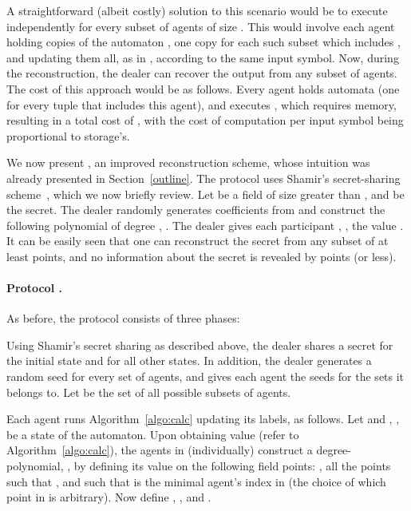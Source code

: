 \documentclass[letterpaper,11pt]{article}
\begin{document}
A straightforward (albeit costly) solution to this scenario would be to execute  independently for every subset of agents of size .  This would involve each agent  holding  copies of the automaton , one copy for each such subset which includes , and updating them all, as in , according to the same input symbol.  
Now, during the reconstruction, the dealer can recover the
output from any subset of  agents. The cost of this approach would be as follows.  Every agent holds  automata (one for every  tuple that includes this agent), and executes , which requires  memory, resulting in a total cost of ,
with the cost of computation per input symbol being proportional to storage's.
 

We now present , an improved  reconstruction scheme,
whose intuition was already presented in Section~\ref{outline}. The protocol
uses Shamir's secret-sharing scheme~\cite{Sha79}, which we now 
briefly review. Let  be a field of
size greater than ,
and  be the secret.
The dealer randomly generates coefficients  from
 and construct the following polynomial of degree ,
. 
The dealer gives each participant , , the value .  It can be easily seen that one can reconstruct the
secret from any subset of at least  points, and no information
about the secret is revealed by 
 points (or less).

\vspace{-.15in}
\paragraph{Protocol .} As before, the protocol consists of
three phases:

\vspace{.05in}
  Using Shamir's secret sharing as
described above, the dealer shares a secret  for the 
initial state and  for all other states.
In addition, the dealer generates a random seed for every
set of  agents, and gives each agent the seeds for the sets it
belongs to. 
Let  be the set of all possible subsets of
 agents.


\vspace{.06in}
 Each agent runs Algorithm~\ref{algo:calc} updating its labels, as follows.   
Let  and , , be a 
state of the automaton.  Upon obtaining value  (refer to Algorithm~\ref{algo:calc}),
the agents in  (individually) construct a
degree- polynomial, , by defining its value on the following
 field points: , all the points  such that ,
and  such that  is the minimal agent's index in  (the choice of 
which point in  is arbitrary). Now define , 
, and .
\end{document}

